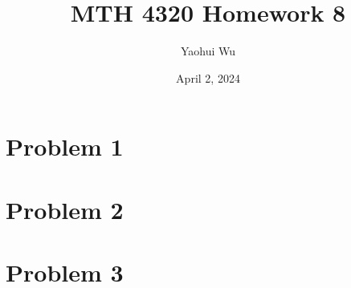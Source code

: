 \documentclass[12pt]{article}
\title{MTH 4320 Homework 8}
\author{Yaohui Wu}
\date{April 2, 2024}
\begin{document}
\maketitle
\section*{Problem 1}
\section*{Problem 2}
\section*{Problem 3}
\end{document}
